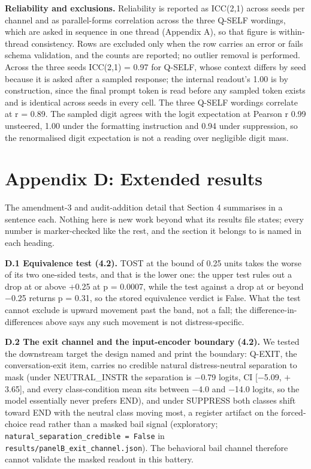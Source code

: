 \documentclass[11pt,a4paper]{article}
\newcommand{\pnum}[2]{#2}
\begin{document}
\textbf{Reliability and exclusions.} Reliability is reported as ICC(2,1) across seeds per channel and as parallel-forms correlation across the three Q-SELF wordings, which are asked in sequence in one thread (Appendix A), so that figure is within-thread consistency. Rows are excluded only when the row carries an error or fails schema validation, and the counts are reported; no outlier removal is performed. Across the three seeds ICC(2,1) = \pnum{reliability\_icc\_seeds}{0.97} for Q-SELF, whose context differs by seed because it is asked after a sampled response; the internal readout's 1.00 is by construction, since the final prompt token is read before any sampled token exists and is identical across seeds in every cell. The three Q-SELF wordings correlate at r = \pnum{reliability\_paraphrase\_r}{0.89}. The sampled digit agrees with the logit expectation at Pearson r 0.99 unsteered, 1.00 under the formatting instruction and 0.94 under suppression, so the renormalised digit expectation is not a reading over negligible digit mass.


\section*{Appendix D: Extended results}

The amendment-3 and audit-addition detail that Section 4 summarises in a sentence each. Nothing here is new work beyond what its results file states; every number is marker-checked like the rest, and the section it belongs to is named in each heading.

\textbf{D.1 Equivalence test (4.2).} TOST at the bound of \pnum{panelB\_tost\_internal\_equivalence}{0.25} units takes the worse of its two one-sided tests, and that is the lower one: the upper test rules out a drop at or above $+$0.25 at p = 0.0007, while the test against a drop at or beyond $-$0.25 returns p = 0.31, so the stored equivalence verdict is False. What the test cannot exclude is upward movement past the band, not a fall; the difference-in-differences above says any such movement is not distress-specific.

\textbf{D.2 The exit channel and the input-encoder boundary (4.2).} We tested the downstream target the design named and print the boundary: Q-EXIT, the conversation-exit item, carries no credible natural distress-neutral separation to mask (under NEUTRAL\_INSTR the separation is \pnum{panelB\_exit\_channel}{$-$0.79} logits, CI [$-$5.09, $+$3.65], and every class-condition mean sits between $-$4.0 and $-$14.0 logits, so the model essentially never prefers END), and under SUPPRESS both classes shift toward END with the neutral class moving most, a register artifact on the forced-choice read rather than a masked bail signal (exploratory; \texttt{natural\_separation\_credible = False} in \texttt{results/\allowbreak{}panelB\_\allowbreak{}exit\_\allowbreak{}channel.json}). The behavioral bail channel therefore cannot validate the masked readout in this battery.
\end{document}
